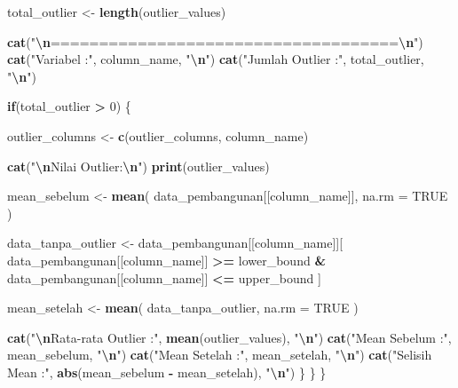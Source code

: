 \documentclass[
  12pt,
]{article}
\newenvironment{Shaded}{\begin{snugshade}}{\end{snugshade}}
\newcommand{\AttributeTok}[1]{\textcolor[rgb]{0.13,0.29,0.53}{#1}}
\newcommand{\ConstantTok}[1]{\textcolor[rgb]{0.56,0.35,0.01}{#1}}
\newcommand{\ControlFlowTok}[1]{\textcolor[rgb]{0.13,0.29,0.53}{\textbf{#1}}}
\newcommand{\DecValTok}[1]{\textcolor[rgb]{0.00,0.00,0.81}{#1}}
\newcommand{\FunctionTok}[1]{\textcolor[rgb]{0.13,0.29,0.53}{\textbf{#1}}}
\newcommand{\NormalTok}[1]{#1}
\newcommand{\OtherTok}[1]{\textcolor[rgb]{0.56,0.35,0.01}{#1}}
\newcommand{\SpecialCharTok}[1]{\textcolor[rgb]{0.81,0.36,0.00}{\textbf{#1}}}
\newcommand{\StringTok}[1]{\textcolor[rgb]{0.31,0.60,0.02}{#1}}
\begin{document}
\begin{Shaded}
\begin{Highlighting}[]
\NormalTok{    total\_outlier }\OtherTok{\textless{}{-}} \FunctionTok{length}\NormalTok{(outlier\_values)}
  
    \FunctionTok{cat}\NormalTok{(}\StringTok{"}\SpecialCharTok{\textbackslash{}n}\StringTok{====================================}\SpecialCharTok{\textbackslash{}n}\StringTok{"}\NormalTok{)}
    \FunctionTok{cat}\NormalTok{(}\StringTok{"Variabel :"}\NormalTok{, column\_name, }\StringTok{"}\SpecialCharTok{\textbackslash{}n}\StringTok{"}\NormalTok{)}
    \FunctionTok{cat}\NormalTok{(}\StringTok{"Jumlah Outlier :"}\NormalTok{, total\_outlier, }\StringTok{"}\SpecialCharTok{\textbackslash{}n}\StringTok{"}\NormalTok{)}
  
    \ControlFlowTok{if}\NormalTok{(total\_outlier }\SpecialCharTok{\textgreater{}} \DecValTok{0}\NormalTok{) \{}
  
\NormalTok{      outlier\_columns }\OtherTok{\textless{}{-}} \FunctionTok{c}\NormalTok{(outlier\_columns, column\_name)}
  
      \FunctionTok{cat}\NormalTok{(}\StringTok{"}\SpecialCharTok{\textbackslash{}n}\StringTok{Nilai Outlier:}\SpecialCharTok{\textbackslash{}n}\StringTok{"}\NormalTok{)}
      \FunctionTok{print}\NormalTok{(outlier\_values)}
  
\NormalTok{      mean\_sebelum }\OtherTok{\textless{}{-}} \FunctionTok{mean}\NormalTok{(}
\NormalTok{        data\_pembangunan[[column\_name]],}
        \AttributeTok{na.rm =} \ConstantTok{TRUE}
\NormalTok{      )}
  
\NormalTok{      data\_tanpa\_outlier }\OtherTok{\textless{}{-}}\NormalTok{ data\_pembangunan[[column\_name]][}
\NormalTok{        data\_pembangunan[[column\_name]] }\SpecialCharTok{\textgreater{}=}\NormalTok{ lower\_bound }\SpecialCharTok{\&}
\NormalTok{        data\_pembangunan[[column\_name]] }\SpecialCharTok{\textless{}=}\NormalTok{ upper\_bound}
\NormalTok{      ]}
  
\NormalTok{      mean\_setelah }\OtherTok{\textless{}{-}} \FunctionTok{mean}\NormalTok{(}
\NormalTok{        data\_tanpa\_outlier,}
        \AttributeTok{na.rm =} \ConstantTok{TRUE}
\NormalTok{      )}
  
      \FunctionTok{cat}\NormalTok{(}\StringTok{"}\SpecialCharTok{\textbackslash{}n}\StringTok{Rata{-}rata Outlier :"}\NormalTok{, }\FunctionTok{mean}\NormalTok{(outlier\_values), }\StringTok{"}\SpecialCharTok{\textbackslash{}n}\StringTok{"}\NormalTok{)}
      \FunctionTok{cat}\NormalTok{(}\StringTok{"Mean Sebelum :"}\NormalTok{, mean\_sebelum, }\StringTok{"}\SpecialCharTok{\textbackslash{}n}\StringTok{"}\NormalTok{)}
      \FunctionTok{cat}\NormalTok{(}\StringTok{"Mean Setelah :"}\NormalTok{, mean\_setelah, }\StringTok{"}\SpecialCharTok{\textbackslash{}n}\StringTok{"}\NormalTok{)}
      \FunctionTok{cat}\NormalTok{(}\StringTok{"Selisih Mean :"}\NormalTok{, }\FunctionTok{abs}\NormalTok{(mean\_sebelum }\SpecialCharTok{{-}}\NormalTok{ mean\_setelah), }\StringTok{"}\SpecialCharTok{\textbackslash{}n}\StringTok{"}\NormalTok{)}
\NormalTok{    \}}
\NormalTok{  \}}
\NormalTok{\}}


\end{Highlighting}
\end{Shaded}
\end{document}
